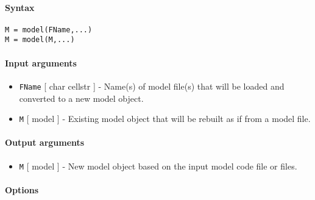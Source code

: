 


	\paragraph{Syntax}

\begin{verbatim}
M = model(FName,...)
M = model(M,...)
\end{verbatim}

\paragraph{Input arguments}

\begin{itemize}
\item
  \texttt{FName} {[} char \textbar{} cellstr {]} - Name(s) of model
  file(s) that will be loaded and converted to a new model object.
\item
  \texttt{M} {[} model {]} - Existing model object that will be rebuilt
  as if from a model file.
\end{itemize}

\paragraph{Output arguments}

\begin{itemize}
\itemsep1pt\parskip0pt
\item
  \texttt{M} {[} model {]} - New model object based on the input model
  code file or files.
\end{itemize}

\paragraph{Options}

